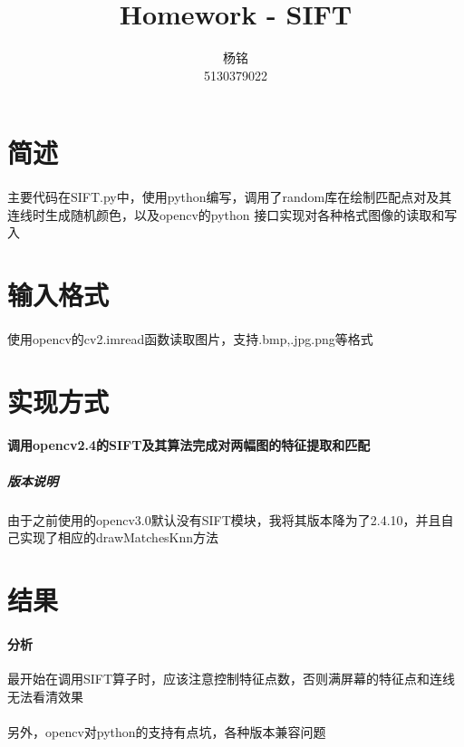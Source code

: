 \documentclass{article}
\author{杨铭\\5130379022}
\title{Homework - SIFT}
\begin{document}
    \maketitle
    \section{简述}
        \paragraph{}主要代码在SIFT.py中，使用python编写，调用了random库在绘制匹配点对及其连线时生成随机颜色，以及opencv的python
    接口实现对各种格式图像的读取和写入
    \section{输入格式}
        \paragraph{}使用opencv的cv2.imread函数读取图片，支持.bmp,.jpg.png等格式
    \section{实现方式}
        \paragraph{调用opencv2.4的SIFT及其算法完成对两幅图的特征提取和匹配}
            \subparagraph{版本说明}由于之前使用的opencv3.0默认没有SIFT模块，我将其版本降为了2.4.10，并且自己实现了相应的drawMatchesKnn方法
        \section{结果}
        \paragraph{分析}最开始在调用SIFT算子时，应该注意控制特征点数，否则满屏幕的特征点和连线无法看清效果
        \paragraph{}另外，opencv对python的支持有点坑，各种版本兼容问题
\end{document}
